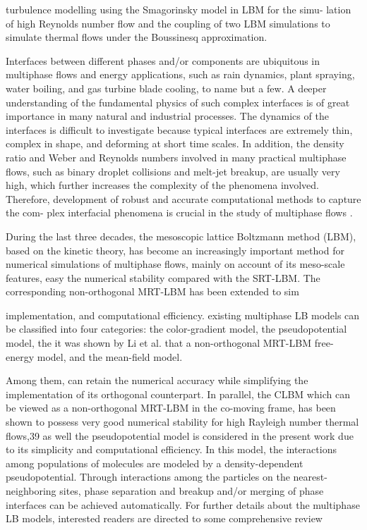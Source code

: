 turbulence modelling using the Smagorinsky model in LBM for the simu- lation of high Reynolds number flow and the coupling of two LBM simulations to simulate thermal flows under the Boussinesq approximation.

Interfaces between different phases and/or components are ubiquitous in multiphase flows and energy applications, such as rain dynamics, plant spraying, water boiling, and gas turbine blade cooling, to name but a few. A deeper understanding of the fundamental physics of such complex interfaces is of great importance in many natural and industrial processes. The dynamics of the interfaces is difficult to investigate because typical interfaces are extremely thin, complex in shape, and deforming at short time scales. In addition, the density ratio and Weber and Reynolds numbers involved in many practical multiphase flows, such as binary droplet collisions and melt-jet breakup, are usually very high, which further increases the complexity of the phenomena involved. Therefore, development of robust and accurate computational methods to capture the com- plex interfacial phenomena is crucial in the study of multiphase flows \cite{feiModelingRealisticMultiphase2019}.

During the last three decades, the mesoscopic lattice Boltzmann method (LBM), based on the kinetic theory, has become an increasingly important method for numerical simulations of multiphase flows, mainly on account of its meso-scale features, easy the numerical stability compared with the SRT-LBM. The corresponding non-orthogonal MRT-LBM has been extended to sim 

implementation, and computational efficiency.
existing multiphase LB models can be classified into four categories: the color-gradient model, the pseudopotential model, the it was shown by Li et al. that a non-orthogonal MRT-LBM free-energy model, and the mean-field model.

Among them, can retain the numerical accuracy while simplifying the implementation of its orthogonal counterpart. In parallel, the CLBM which can be viewed as a non-orthogonal MRT-LBM in the co-moving frame, has been shown to possess very good numerical stability for high Rayleigh number thermal flows,39 as well the pseudopotential model is considered in the present work due to its simplicity and computational efficiency. In this model, the interactions among populations of molecules are modeled by a density-dependent pseudopotential. Through interactions among the particles on the nearest-neighboring sites, phase separation and breakup and/or merging of phase interfaces can be achieved automatically. For further details about the multiphase LB models, interested readers are directed to some comprehensive review

